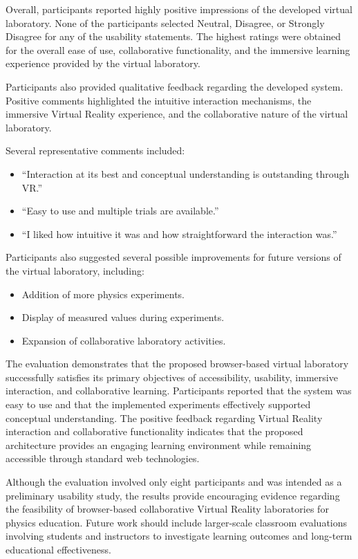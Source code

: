 Overall, participants reported highly positive impressions of the developed virtual laboratory. None of the participants selected Neutral, Disagree, or Strongly Disagree for any of the usability statements. The highest ratings were obtained for the overall ease of use, collaborative functionality, and the immersive learning experience provided by the virtual laboratory.

Participants also provided qualitative feedback regarding the developed system. Positive comments highlighted the intuitive interaction mechanisms, the immersive Virtual Reality experience, and the collaborative nature of the virtual laboratory.

Several representative comments included:

\begin{itemize}
\item ``Interaction at its best and conceptual understanding is outstanding through VR.''
\item ``Easy to use and multiple trials are available.''
\item ``I liked how intuitive it was and how straightforward the interaction was.''
\end{itemize}

Participants also suggested several possible improvements for future versions of the virtual laboratory, including:

\begin{itemize}
\item Addition of more physics experiments.
\item Display of measured values during experiments.
\item Expansion of collaborative laboratory activities.
\end{itemize}

The evaluation demonstrates that the proposed browser-based virtual laboratory successfully satisfies its primary objectives of accessibility, usability, immersive interaction, and collaborative learning. Participants reported that the system was easy to use and that the implemented experiments effectively supported conceptual understanding. The positive feedback regarding Virtual Reality interaction and collaborative functionality indicates that the proposed architecture provides an engaging learning environment while remaining accessible through standard web technologies.

Although the evaluation involved only eight participants and was intended as a preliminary usability study, the results provide encouraging evidence regarding the feasibility of browser-based collaborative Virtual Reality laboratories for physics education. Future work should include larger-scale classroom evaluations involving students and instructors to investigate learning outcomes and long-term educational effectiveness.


